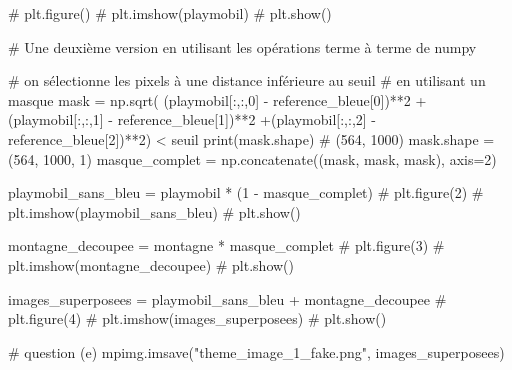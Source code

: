 \documentclass[10pt,fleqn]{article} %
\begin{document}
\begin{multicols}{2}
\begin{corrige}
\begin{python}
# plt.figure()
# plt.imshow(playmobil)
# plt.show()

# Une deuxième version en utilisant les opérations terme à terme de numpy

# on sélectionne les pixels à une distance inférieure au seuil
# en utilisant un masque
mask = np.sqrt( (playmobil[:,:,0] - reference_bleue[0])**2
               +(playmobil[:,:,1] - reference_bleue[1])**2
               +(playmobil[:,:,2] - reference_bleue[2])**2) < seuil
print(mask.shape)
# (564, 1000)
mask.shape = (564, 1000, 1)
masque_complet = np.concatenate((mask, mask, mask), axis=2)

playmobil_sans_bleu = playmobil * (1 - masque_complet)
# plt.figure(2)
# plt.imshow(playmobil_sans_bleu)
# plt.show()

montagne_decoupee = montagne * masque_complet
# plt.figure(3)
# plt.imshow(montagne_decoupee)
# plt.show()

images_superposees = playmobil_sans_bleu + montagne_decoupee
# plt.figure(4)
# plt.imshow(images_superposees)
# plt.show()

# question (e)
mpimg.imsave("theme_image_1_fake.png", images_superposees)
\end{python}
\end{corrige}
\else
\fi


\ifprof
\else
\end{multicols}
\fi
\end{document}
